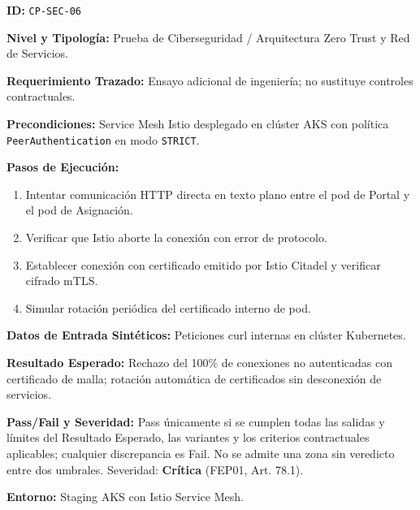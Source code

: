 \par\noindent\textbf{ID:} \texttt{C\allowbreak{}P\allowbreak{}-\allowbreak{}S\allowbreak{}E\allowbreak{}C\allowbreak{}-\allowbreak{}0\allowbreak{}6\allowbreak{}}\par
\par\noindent\textbf{Nivel y Tipología:} Prueba de Ciberseguridad / Arquitectura Zero Trust y Red de Servicios.\par
\par\noindent\textbf{Requerimiento Trazado:} Ensayo adicional de ingeniería; no sustituye controles contractuales.\par
\par\noindent\textbf{Precondiciones:} Service Mesh Istio desplegado en clúster AKS con política \texttt{P\allowbreak{}e\allowbreak{}e\allowbreak{}r\allowbreak{}A\allowbreak{}u\allowbreak{}t\allowbreak{}h\allowbreak{}e\allowbreak{}n\allowbreak{}t\allowbreak{}i\allowbreak{}c\allowbreak{}a\allowbreak{}t\allowbreak{}i\allowbreak{}o\allowbreak{}n\allowbreak{}} en modo \texttt{S\allowbreak{}T\allowbreak{}R\allowbreak{}I\allowbreak{}C\allowbreak{}T\allowbreak{}}.\par
\par\noindent\textbf{Pasos de Ejecución:} \par
\begin{enumerate}
\item Intentar comunicación HTTP directa en texto plano entre el pod de Portal y el pod de Asignación.
\item Verificar que Istio aborte la conexión con error de protocolo.
\item Establecer conexión con certificado emitido por Istio Citadel y verificar cifrado mTLS.
\item Simular rotación periódica del certificado interno de pod.
\end{enumerate}
\par\noindent\textbf{Datos de Entrada Sintéticos:} Peticiones curl internas en clúster Kubernetes.\par
\par\noindent\textbf{Resultado Esperado:} Rechazo del 100\% de conexiones no autenticadas con certificado de malla; rotación automática de certificados sin desconexión de servicios.\par
\par\noindent\textbf{Pass/Fail y Severidad:} Pass únicamente si se cumplen todas las salidas y límites del Resultado Esperado, las variantes y los criterios contractuales aplicables; cualquier discrepancia es Fail. No se admite una zona sin veredicto entre dos umbrales. Severidad: \textbf{Crítica} (FEP01, Art. 78.1).\par
\par\noindent\textbf{Entorno:} Staging AKS con Istio Service Mesh.\par






